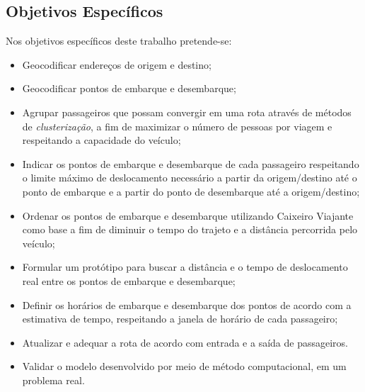 \subsection{Objetivos Específicos}
Nos objetivos específicos deste trabalho pretende-se:
\begin{itemize}
    \item Geocodificar endereços de origem e destino;
    
    \item Geocodificar pontos de embarque e desembarque;
    
    \item Agrupar passageiros que possam convergir em uma rota através de métodos de \emph{clusterização}, a fim de maximizar o número de pessoas por viagem e respeitando a capacidade do veículo;
    
    \item Indicar os pontos de embarque e desembarque de cada passageiro respeitando o limite máximo de deslocamento necessário a partir da origem/destino até o ponto de embarque e a partir do ponto de desembarque até a origem/destino;
    
    \item Ordenar os pontos de embarque e desembarque utilizando Caixeiro Viajante como base a fim de diminuir o tempo do trajeto e a distância percorrida pelo veículo;
    
    \item Formular um protótipo para buscar a distância e o tempo de deslocamento real entre os pontos de embarque e desembarque;
    
    \item Definir os horários de embarque e desembarque dos pontos de acordo com a estimativa de tempo, respeitando a janela de horário de cada passageiro;
    
    \item Atualizar e adequar a rota de acordo com entrada e a saída de passageiros.
    
    \item Validar o modelo desenvolvido por meio de método computacional, em um problema real.
    
\end{itemize}


